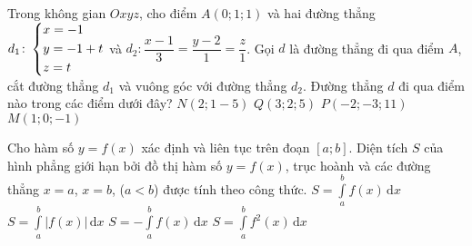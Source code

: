\begin{ex}%
	Trong không gian $Oxyz$, cho điểm $A(0;1;1)$ và hai đường thẳng $d_1\colon \left\{\begin{aligned}&x=-1\\&y=-1+t\\&z=t\end{aligned}\right.$ và $d_2\colon \dfrac{x-1}{3}=\dfrac{y-2}{1}=\dfrac{z}{1}$. Gọi $d$ là đường thẳng đi qua điểm $A$, cắt đường thẳng $d_1$ và vuông góc với đường thẳng $d_2$. Đường thẳng $d$ đi qua điểm nào trong các điểm dưới đây?
	\choice%
	{$N(2;1-5)$}
	{$Q(3;2;5)$}
	{$P(-2;-3;11)$}
	{\True $M(1;0;-1)$}
\end{ex}

\begin{ex}%
	Cho hàm số $y=f(x)$ xác định và liên tục trên đoạn $[a;b]$. Diện tích $S$ của hình phẳng giới hạn bởi đồ thị hàm số $y=f(x)$, trục hoành và các đường thẳng $x=a$, $x=b$, ($a<b$) được  tính theo công thức.
	\choice%
	{$S=\displaystyle \int\limits_{a}^{b} f(x)\mathrm{\,d}x$}
	{\True $S=\displaystyle \int\limits_{a}^{b} |f(x)|\mathrm{\,d}x$}
	{$S=-\displaystyle \int\limits_{a}^{b} f(x)\mathrm{\,d}x$}
	{$S=\displaystyle \int\limits_{a}^{b} f^2(x)\mathrm{\,d}x$}
\end{ex}

